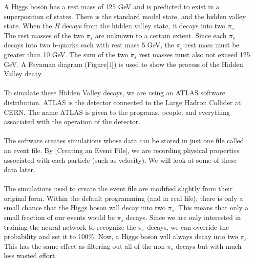 \documentclass[10pt,a4paper]{report}
\begin{document}
A Higgs boson has a rest mass of 125 GeV and is predicted to exist in a superposition of states. There is the standard model state, and the hidden valley state. When the $H$ decays from the hidden valley state, it decays into two $\pi_s$. The rest masses of the two $\pi_s$ are unknown to a certain extent. Since each $\pi_s$ decays into two b-quarks each with rest mass 5 GeV, the $\pi_s$ rest mass must be greater than 10 GeV. The sum of the two $\pi_s$ rest masses must also not exceed 125 GeV. A Feynman diagram (Figure[1]) is used to show the process of the Hidden Valley decay.\\\\
To simulate these Hidden Valley decays, we are using an ATLAS software distribution. ATLAS is the detector connected to the Large Hadron Collider at CERN. The name ATLAS is given to the programs, people, and everything associated with the operation of the detector.\\\\
The software creates simulations whose data can be stored in just one file called an event file. By [Creating an Event File], we are recording physical properties associated with each particle (such as velocity). We will look at some of these data later.\\\\
The simulations used to create the event file are modified slightly from their original form. Within the default programming (and in real life), there is only a small chance that the Higgs boson will decay into two $\pi_s$. This means that only a small fraction of our events would be $\pi_s$ decays. Since we are only interested in training the neural network to recognize the $\pi_s$ decays, we can override the probability and set it to 100\%. Now, a Higgs boson will always decay into two $\pi_s$. This has the same effect as filtering out all of the non-$\pi_s$ decays but with much less wasted effort.\\\\
\end{document}
